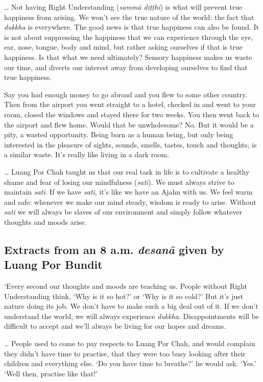 \ldots{} Not having Right Understanding (\emph{sammā diṭṭhi}) is what
will prevent true happiness from arising. We won't see the true nature
of the world: the fact that \emph{dukkha} is everywhere. The good news
is that true happiness can also be found. It is not about suppressing
the happiness that we can experience through the eye, ear, nose, tongue, 
body and mind, but rather asking ourselves if that is true happiness. Is
that what we need ultimately? Sensory happiness makes us waste our time, 
and diverts our interest away from developing ourselves to find that
true happiness. 

Say you had enough money to go abroad and you flew to some other
country. Then from the airport you went straight to a hotel, checked in
and went to your room, closed the windows and stayed there for two
weeks. You then went back to the airport and flew home. Would that be
unwholesome? No. But it would be a pity, a wasted opportunity. Being
born as a human being, but only being interested in the pleasure of
sights, sounds, smells, tastes, touch and thoughts, is a similar waste. 
It's really like living in a dark room. 

\ldots{} Luang Por Chah taught us that our real task in life is to
cultivate a healthy shame and fear of losing our mindfulness
(\emph{sati}). We must always strive to maintain \emph{sati}. If we have
\emph{sati}, it's like we have an Ajahn with us. We feel warm and safe:
whenever we make our mind steady, wisdom is ready to arise. Without
\emph{sati} we will always be slaves of our environment and simply
follow whatever thoughts and moods arise.

\subsection*{Extracts from an 8 a.m. \emph{desanā} given by Luang Por Bundit}

`Every second our thoughts and moods are teaching us. People without
Right Understanding think, `Why is it so hot?' or `Why is it so cold?'
But it's just nature doing its job. We don't have to make such a big
deal out of it. If we don't understand the world, we will always
experience \emph{dukkha}. Disappointments will be difficult to accept
and we'll always be living for our hopes and dreams. 

\ldots{} People used to come to pay respects to Luang Por Chah, and
would complain they didn't have time to practise, that they were too
busy looking after their children and everything else. `Do you have time
to breathe?' he would ask. `Yes.' `Well then, practise like that!'

